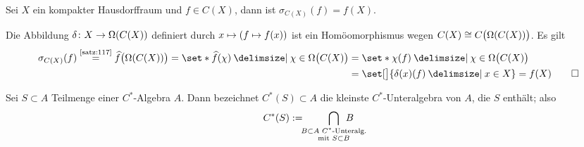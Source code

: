 \begin{bemerkung}[label=bem217,{name=[Spektrum von $f \in C(X)$ für $X$ kompakt]}]
	Sei $X$ ein kompakter Hausdorffraum und $f \in C(X)$, dann ist $\sigma_{C(X)}(f)=f(X)$.
\end{bemerkung}
\begin{beweis}
	Die Abbildung $\delta \colon X \to \Omega\enbrace*{C(X)}$ definiert durch $x \mapsto \enbrace*{f \mapsto f(x)}$ ist ein Homöomorphismus wegen $C(X) \cong C \enbrace[\big]{\Omega(C(X))}$. 
	Es gilt
	\begin{align}
		\sigma_{C(X)}(f) \StackText{\ref{satz:117}}{=} \widehat{f} \enbrace[\big]{\Omega(C(X))} = \set*{\widehat{f}(\chi) \given \chi \in \Omega \enbrace[\big]{C(X)}} 
		&= \set*{\chi(f) \given \chi \in \Omega \enbrace[\big]{C(X)}} \\
		&= \set[\big]{\delta(x)(f) \given x \in X} = f(X) \qedhere
	\end{align}
\end{beweis}

\begin{definition}[{name=[erzeuge C*-Algebra]}]
	Sei $S \subset A$ Teilmenge einer $C^*$-Algebra $A$.
	Dann bezeichnet $C^*(S) \subset A$ die kleinste $C^*$-Unteralgebra von $A$, die $S$ enthält; also
	\[
		C^*(S) := \hspace{-1ex} \smashoperator[r]{\bigcap_{\substack{B \subset A \text{ $C^*$-Unteralg.}\\ \text{mit } S \subset B}}} \enspace B
	\]
\end{definition}

